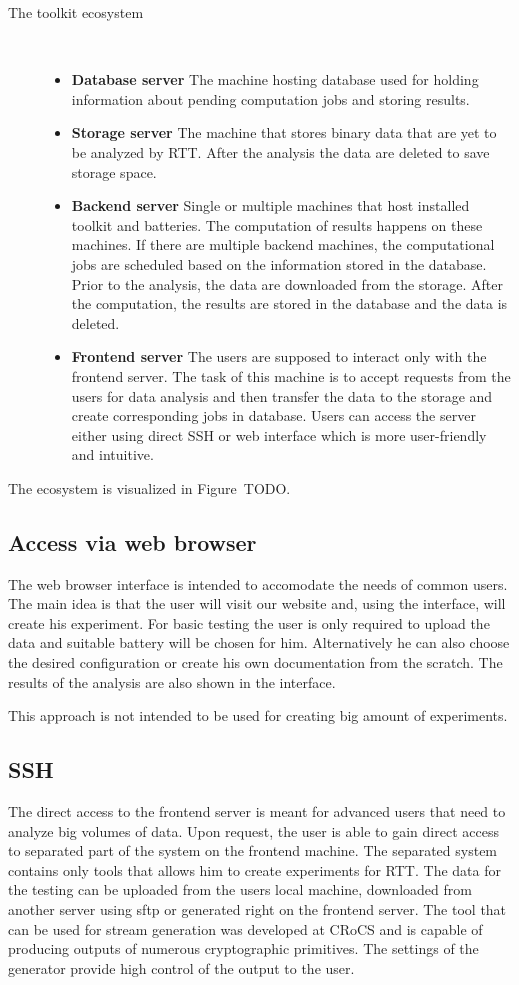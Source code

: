 \documentclass[
  digital,  	%
  color,		%
  oneside,   	%
  12pt,
  nocover,
  notable,
  nolof,
  nolot,
]{fithesis3}
\newenvironment{titlemize}[1]
{
	\begin{description}
	\item[#1]\
	\begin{itemize}
}
{
	\end{itemize}
 	\end{description}
}
\begin{document}
\begin{titlemize}{The toolkit ecosystem} %
\item \textbf{Database server} The machine hosting database used for holding information about pending computation jobs and storing results.
\item \textbf{Storage server} The machine that stores binary data that are yet to be analyzed by RTT. After the analysis the data are deleted to save storage space.
\item \textbf{Backend server} Single or multiple machines that host installed toolkit and batteries. The computation of results happens on these machines. If there are multiple backend machines, the computational jobs are scheduled based on the information stored in the database. Prior to the analysis, the data are downloaded from the storage.  After the computation, the results are stored in the database and the data is deleted.
\item \textbf{Frontend server} The users are supposed to interact only with the frontend server. The task of this machine is to accept requests from the users for data analysis and then transfer the data to the storage and create corresponding jobs in database. Users can access the server either using direct SSH or web interface which is more user-friendly and intuitive.
\end{titlemize}

The ecosystem is visualized in Figure~TODO.


\subsection{Access via web browser}
The web browser interface is intended to accomodate the needs of common users. The main idea is that the user will visit our website and, using the interface, will create his experiment. For basic testing the user is only required to upload the data and suitable battery will be chosen for him. Alternatively he can also choose the desired configuration or create his own documentation from the scratch. The results of the analysis are also shown in the interface. 

This approach is not intended to be used for creating big amount of experiments.

\subsection{SSH}
The direct access to the frontend server is meant for advanced users that need to analyze big volumes of data. Upon request, the user is able to gain direct access to separated part of the system on the frontend machine. The separated system contains only tools that allows him to create experiments for RTT. The data for the testing can be uploaded from the users local machine, downloaded from another server using sftp or generated right on the frontend server. The tool that can be used for stream generation was developed at CRoCS and is capable of producing outputs of numerous cryptographic primitives. The settings of the generator provide high control of the output to the user. 
\end{document}
